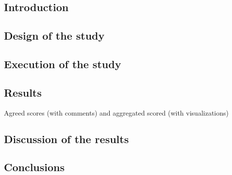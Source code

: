 \subsection{Introduction}

\subsection{Design of the study}

\subsection{Execution of the study}

\subsection{Results}
Agreed scores (with comments) and aggregated scored (with visualizations)

\subsection{Discussion of the results}

\subsection{Conclusions}
